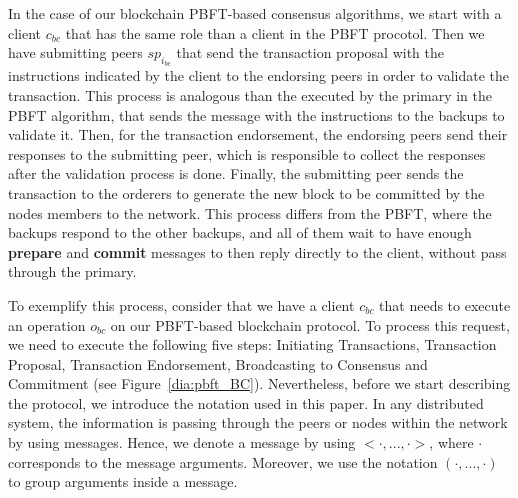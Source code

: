\documentclass[conference]{llncs}
\begin{document}
In the case of our blockchain PBFT-based consensus algorithms, we start with a client $c_{bc}$ that has the same role than a client in the PBFT procotol. Then we have submitting peers $sp_{i_{bc}}$ that send the transaction proposal with the instructions indicated by the client to the endorsing peers in order to validate the transaction. This process is analogous than the executed by the primary in the PBFT algorithm, that sends the message with the instructions to the backups to validate it. Then, for the transaction endorsement, the endorsing peers send their responses to the submitting peer, which is responsible to collect the responses after the validation process is done. Finally, the submitting peer sends the transaction to the orderers to generate the new block to be committed by the nodes members to the network. This process differs from the PBFT, where the backups respond to the other backups, and all of them wait to have enough \textbf{prepare} and \textbf{commit} messages to then reply directly to the client, without pass through the primary. 

To exemplify this process, consider that we have a client $c_{bc}$ that needs to execute an operation $o_{bc}$ on our PBFT-based blockchain protocol. To process this request, we need to execute the following five steps: Initiating Transactions, Transaction Proposal, Transaction Endorsement, Broadcasting to Consensus and Commitment (see Figure~\ref{dia:pbft_BC}). Nevertheless,  before we start describing the protocol, we introduce the notation used in this paper. In any distributed system, the information is passing through the peers or nodes within the network by using messages. Hence, we  denote a message by using $<\cdot,...,\cdot>$, where $\cdot$ corresponds to the message arguments. Moreover, we use the notation $(\cdot,...,\cdot)$ to group arguments inside a message.
\end{document}
